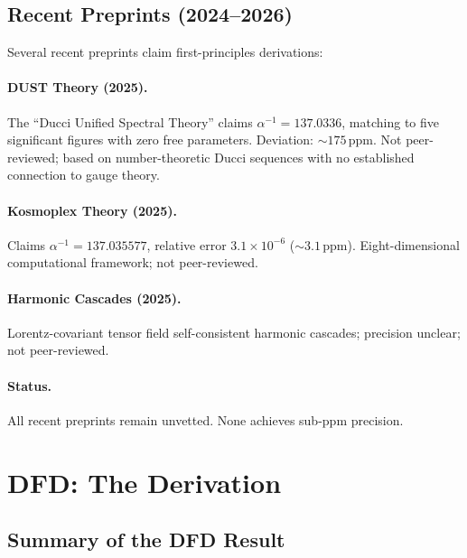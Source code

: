 \documentclass[11pt,a4paper]{article}
\begin{document}
\subsection{Recent Preprints (2024--2026)}\label{sec:recent}

Several recent preprints claim first-principles derivations:

\paragraph{DUST Theory (2025).}
The ``Ducci Unified Spectral Theory'' claims $\alpha^{-1}=137.0336$, matching to five significant figures with zero free parameters.  Deviation: $\sim 175$\,ppm.  Not peer-reviewed; based on number-theoretic Ducci sequences with no established connection to gauge theory.

\paragraph{Kosmoplex Theory (2025).}
Claims $\alpha^{-1}=137.035577$, relative error $3.1\times 10^{-6}$ ($\sim 3.1$\,ppm).  Eight-dimensional computational framework; not peer-reviewed.

\paragraph{Harmonic Cascades (2025).}
Lorentz-covariant tensor field self-consistent harmonic cascades; precision unclear; not peer-reviewed.

\paragraph{Status.}
All recent preprints remain unvetted.  None achieves sub-ppm precision.

\section{DFD: The Derivation}\label{sec:dfd}

\subsection{Summary of the DFD Result}
\end{document}
